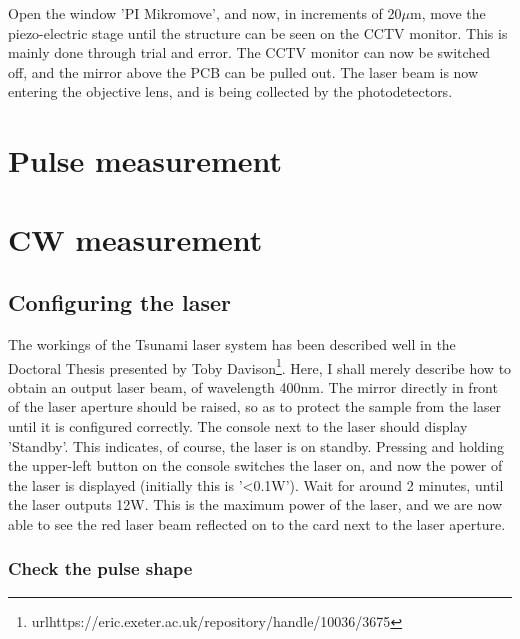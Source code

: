 \documentclass[14pt,a4paper] {article}
\begin{document}
Open the window 'PI Mikromove', and now, in increments of 20$\mu$m, move the piezo-electric stage until the structure can be seen on the CCTV monitor. This is mainly done through trial and error. The CCTV monitor can now be switched off, and the mirror above the PCB can be pulled out. The laser beam is now entering the objective lens, and is being collected by the photodetectors.

\section{Pulse measurement}

\section{CW measurement}


\subsection{Configuring the laser}

The workings of the Tsunami laser system has been described well in the Doctoral Thesis presented by Toby Davison\footnote{url{https://eric.exeter.ac.uk/repository/handle/10036/3675}}. Here, I shall merely describe how to obtain an output laser beam, of wavelength 400nm. The mirror directly in front of the laser aperture should be raised, so as to protect the sample from the laser until it is configured correctly. The console next to the laser should display 'Standby'. This indicates, of course, the laser is on standby. Pressing and holding the upper-left button on the console switches the laser on, and now the power of the laser is displayed (initially this is '<0.1W'). Wait for around 2 minutes, until the laser outputs 12W. This is the maximum power of the laser, and we are now able to see the red laser beam reflected on to the card next to the laser aperture.


\subsubsection{Check the pulse shape}

\end{document}
